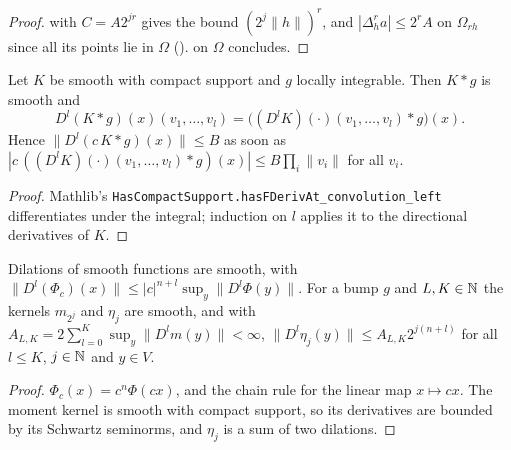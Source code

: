 \begin{proof}
\leanok
{}
 with $C = A 2^{jr}$ gives the bound $(2^j \|h\|)^r$, and
$|\Delta_h^r a| \leq 2^r A$ on $\Omega_{rh}$ since all its points lie in $\Omega$
().
 on $\Omega$ concludes.
\end{proof}

\begin{lemma}
\label{lem:conv-derivatives}
\leanok
{}
Let $K$ be smooth with compact support and $g$ locally integrable. Then $K * g$ is smooth and
\[
  D^l (K * g)(x)(v_1, \dots, v_l) = \bigl((D^l K)(\cdot)(v_1, \dots, v_l) * g\bigr)(x) .
\]
Hence $\|D^l (c\, K * g)(x)\| \leq B$ as soon as
$|c\, ((D^l K)(\cdot)(v_1, \dots, v_l) * g)(x)| \leq B \prod_i \|v_i\|$ for all $v_i$.
\end{lemma}

\begin{proof}
\leanok
Mathlib's \texttt{HasCompactSupport.hasFDerivAt\_convolution\_left} differentiates under the
integral; induction on $l$ applies it to the directional derivatives of $K$.
\end{proof}

\begin{lemma}
\label{lem:dual-kernel-derivatives}
\leanok
{}
Dilations of smooth functions are smooth, with
$\|D^l (\Phi_c)(x)\| \leq |c|^{n+l} \sup_y \|D^l \Phi(y)\|$. For a bump $g$ and $L, K \in \mathbb{N}$ the
kernels $m_{2^j}$ and $\eta_j$ are smooth, and with
$A_{L,K} = 2 \sum_{l=0}^K \sup_y \|D^l m(y)\| < \infty$,
$\|D^l \eta_j(y)\| \leq A_{L,K} 2^{j(n+l)}$ for all $l \leq K$, $j \in \mathbb{N}$ and $y \in V$.
\end{lemma}

\begin{proof}
\leanok
$\Phi_c(x) = c^n \Phi(cx)$, and the chain rule for the linear map $x \mapsto cx$. The moment kernel
is smooth with compact support, so its derivatives are bounded by its Schwartz seminorms, and
$\eta_j$ is a sum of two dilations.
\end{proof}

